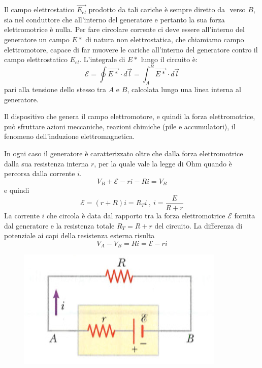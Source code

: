 \documentclass[class=book, crop=false, oneside, 12pt]{standalone}
\begin{document}
Il campo elettrostatico \(\overrightarrow{E_{el}}\) prodotto da tali cariche è sempre diretto da \(\) verso \(B\), sia nel conduttore che all'interno del generatore e pertanto la sua forza elettromotrice è nulla. 
Per fare circolare corrente ci deve essere all'interno del generatore un campo \( E*\) di natura non elettrostatica, che chiamiamo campo elettromotore, capace di far muovere le cariche all'interno del generatore contro il campo elettrostatico \(E_{el}\).
L'integrale di \(E*\) lungo il circuito è: 
\begin{equation}
    \mathcal{E} = \oint \overrightarrow{E*} \cdot d \overrightarrow{l} = \int_A^B \overrightarrow{E*} \cdot d \overrightarrow{l}
\end{equation}
pari alla tensione dello stesso tra \(A\) e \(B\), calcolata lungo una linea interna al generatore.

Il dispositivo che genera il campo elettromotore, e quindi la forza elettromotrice, può sfruttare azioni meccaniche, reazioni chimiche (pile e accumulatori), il fenomeno dell'induzione elettromagnetica.

In ogni caso il generatore è caratterizzato oltre che dalla forza elettromotrice dalla sua resistenza interna \(r\), per la quale vale la legge di Ohm quando è percorsa dalla corrente \(i\).
\begin{equation*}
    V_B + \mathcal{E} - ri - Ri = V_B
\end{equation*}
e quindi
\begin{equation} \label{circuitazione}
    \mathcal{E} = \left(r + R\right) i  = R_T i \ , \ i = \frac{E}{R + r}
\end{equation}
La corrente \(i\) che circola è data dal rapporto tra la forza elettromotrice \(\mathcal{E}\) fornita dal generatore e la resistenza totale \(R_T = R + r\) del circuito. 
La differenza di potenziale ai capi della resistenza esterna risulta
\begin{equation} \label{ddp_res_esterna}
    V_A - V_B = R i = \mathcal{E} - ri
\end{equation}

\begin{figure}[h]
    \includegraphics[scale=0.6]{resistenze_circuito.png}
    \centering
    \caption{}
\end{figure}
\end{document}
